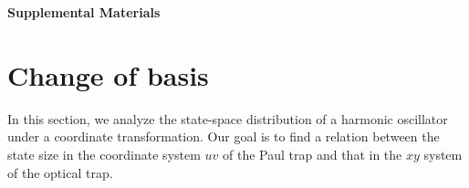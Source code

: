 

%




\clearpage
\onecolumngrid

\renewcommand{\thefigure}{S\arabic{figure}}
\renewcommand{\theequation}{S\arabic{equation}}
\renewcommand{\thesection}{S\arabic{section}}
\setcounter{equation}{0}
\setcounter{figure}{0}
\setcounter{section}{0}
\newcommand{\Supps}[1]{Supp.~\ref{sec:#1}}

\begin{center}
  \LARGE
  \textbf{Supplemental Materials}
\end{center}


\section{Change of basis}
\label{sec:SM_change_of_basis}
In this section, we analyze the state-space distribution of a harmonic oscillator under a coordinate transformation. Our goal is to find a relation between the state size in the coordinate system $uv$ of the Paul trap and that in the $xy$ system of the optical trap.

